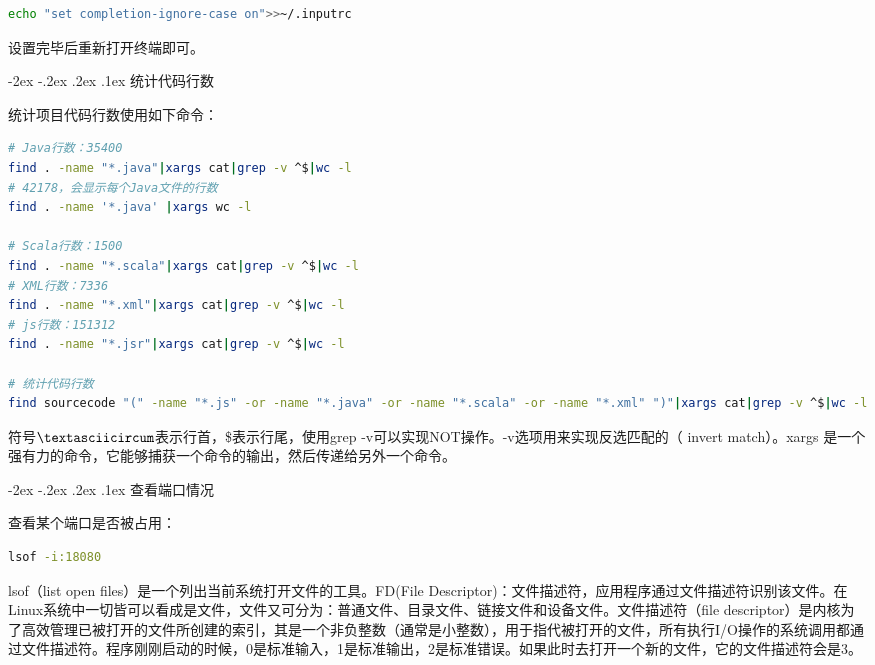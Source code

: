 \documentclass[11pt,fleqn]{book}
\makeatletter
\numberwithin{dummy}{section}
\theoremstyle{ocrenumbox}
\theoremstyle{blacknumex}
\theoremstyle{blacknumbox}
\theoremstyle{ocrenum}
\renewcommand\paragraph{\@startsection{paragraph}{4}{\z@}
	{-2ex \@plus-.2ex \@minus .2ex}
	{.1ex}
	{\normalfont\small\sffamily\bfseries}}
\makeatother
\begin{document}
\begin{lstlisting}[language=Bash]
echo "set completion-ignore-case on">>~/.inputrc
\end{lstlisting}

设置完毕后重新打开终端即可。

\paragraph{统计代码行数}

统计项目代码行数使用如下命令：

\begin{lstlisting}[language=Bash]
# Java行数：35400
find . -name "*.java"|xargs cat|grep -v ^$|wc -l
# 42178，会显示每个Java文件的行数
find . -name '*.java' |xargs wc -l

# Scala行数：1500
find . -name "*.scala"|xargs cat|grep -v ^$|wc -l
# XML行数：7336
find . -name "*.xml"|xargs cat|grep -v ^$|wc -l
# js行数：151312
find . -name "*.jsr"|xargs cat|grep -v ^$|wc -l

# 统计代码行数
find sourcecode "(" -name "*.js" -or -name "*.java" -or -name "*.scala" -or -name "*.xml" ")"|xargs cat|grep -v ^$|wc -l
\end{lstlisting}

符号$\textasciicircum$表示行首，\$表示行尾，使用grep -v可以实现NOT操作。-v选项用来实现反选匹配的（ invert match）。xargs 是一个强有力的命令，它能够捕获一个命令的输出，然后传递给另外一个命令。

\paragraph{查看端口情况}

查看某个端口是否被占用：

\begin{lstlisting}[language=Bash]
lsof -i:18080
\end{lstlisting}

lsof（list open files）是一个列出当前系统打开文件的工具。FD(File Descriptor)：文件描述符，应用程序通过文件描述符识别该文件。在Linux系统中一切皆可以看成是文件，文件又可分为：普通文件、目录文件、链接文件和设备文件。文件描述符（file descriptor）是内核为了高效管理已被打开的文件所创建的索引，其是一个非负整数（通常是小整数），用于指代被打开的文件，所有执行I/O操作的系统调用都通过文件描述符。程序刚刚启动的时候，0是标准输入，1是标准输出，2是标准错误。如果此时去打开一个新的文件，它的文件描述符会是3。
\end{document}
